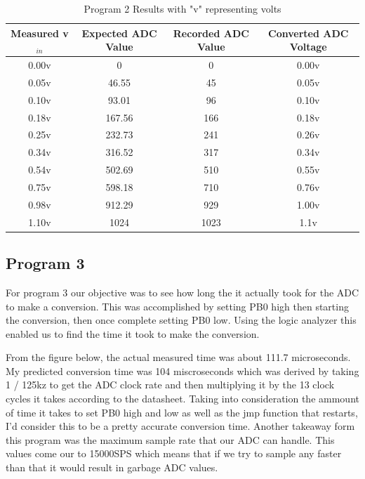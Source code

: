 \documentclass[11pt,pdftex,portrait,letterpaper]{article}
\begin{document}
	
\begin{table}[htb]
	\centering
	\begin{tabular}{ | c | c | c | c | }	%
		\hline
		\textbf{Measured v$_{in}$} & \textbf{Expected ADC Value} & \textbf{Recorded ADC Value} & \textbf{Converted ADC Voltage} \\ \hline \hline
		0.00v & 0 & 0  & 0.00v \\ \hline
		0.05v & 46.55 & 45  & 0.05v \\ \hline
		0.10v & 93.01 & 96  & 0.10v \\ \hline
		0.18v & 167.56 & 166 & 0.18v \\ \hline
		0.25v & 232.73 &  241 & 0.26v \\ \hline
		0.34v & 316.52 &  317 & 0.34v \\ \hline
		0.54v & 502.69 &  510 & 0.55v \\ \hline
		0.75v & 598.18 &  710 & 0.76v \\ \hline
		0.98v & 912.29 & 929  & 1.00v \\ \hline
		1.10v & 1024 & 1023  & 1.1v \\ \hline
		
	\end{tabular}
	\caption{Program 2 Results with "v" representing volts }
	\label{t:table1}	%
\end{table}

	\pagebreak
	
	\subsection{Program 3}
	
For program 3 our objective was to see how long the it actually took for the ADC to make a conversion. This was accomplished by setting PB0 high then starting the conversion, then once complete setting PB0 low. Using the logic analyzer this enabled us to find the time it took to make the conversion.

From the figure below, the actual measured time was about 111.7 microseconds. My predicted conversion time was 104 miscroseconds which was derived by taking 1 / 125kz to get the ADC clock rate and then multiplying it by the 13 clock cycles it takes according to the datasheet. Taking into consideration the ammount of time it takes to set PB0 high and low as well as the jmp function that restarts, I'd consider this to be a pretty accurate conversion time.  Another takeaway form this program was the maximum sample rate that our ADC can handle. This values come our to 15000SPS which means that if we try to sample any faster than that it would result in garbage ADC values.
\end{document}
